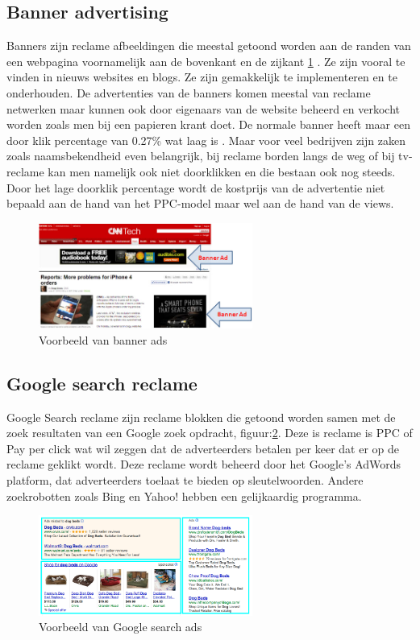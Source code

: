 \documentclass[pdftex,a4paper,12pt,twoside]{report}
\begin{document}
\subsection{Banner advertising }
\label{sec Banner advertising }
Banners zijn reclame afbeeldingen die meestal getoond worden aan de randen van een webpagina voornamelijk aan de bovenkant en de zijkant \ref{fig: Banner-Ads} . Ze zijn vooral te vinden in nieuws websites en blogs. Ze zijn gemakkelijk te implementeren en te onderhouden. De advertenties van de banners komen meestal van reclame netwerken maar kunnen ook door eigenaars van de website beheerd en verkocht worden zoals men bij een papieren krant doet. De normale banner heeft maar een door klik percentage van 0.27\% wat laag is \cite{Chaffey2016}. Maar voor veel bedrijven zijn zaken zoals naamsbekendheid even belangrijk, bij reclame borden langs de weg of bij tv-reclame kan men namelijk ook niet doorklikken en die bestaan ook nog steeds. Door het lage doorklik percentage wordt de kostprijs van de advertentie niet bepaald aan de hand van het PPC-model maar wel aan de hand van de views. 
\begin{figure}[h!]
\centering
\includegraphics[width=7cm]{img/Banner-Ads}
\caption{Voorbeeld van banner ads}
\label{fig: Banner-Ads}
\end{figure}
\subsection{Google search reclame }
\label{sec Google search reclame }
Google Search reclame zijn reclame blokken die getoond worden samen met de zoek resultaten van een Google zoek opdracht, figuur:\ref{fig: Google-Search-ad}. Deze is reclame is PPC of Pay per click wat wil zeggen dat de adverteerders betalen per keer dat er op de reclame geklikt wordt. Deze reclame wordt beheerd door het Google’s AdWords platform, dat adverteerders toelaat te bieden op sleutelwoorden. Andere zoekrobotten zoals Bing en Yahoo! hebben een gelijkaardig programma.
\begin{figure}[h!]
\centering
\includegraphics[width=7cm]{img/example-of-google-ads}
\caption{Voorbeeld van Google search ads}
\label{fig: Google-Search-ad}
\end{figure}
\end{document}
